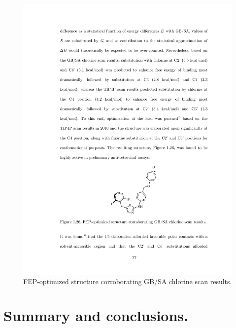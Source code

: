 \documentclass[12pt]{report}
\begin{document}
\begin{figure}[htbp]
\centering
\includegraphics[scale=0.99]{figures/pdf/coreopt.pdf}
\caption{FEP-optimized structure corroborating GB/SA chlorine scan results.}
\label{coreopt}
\end{figure}


\section{Summary and conclusions.}
\end{document}
